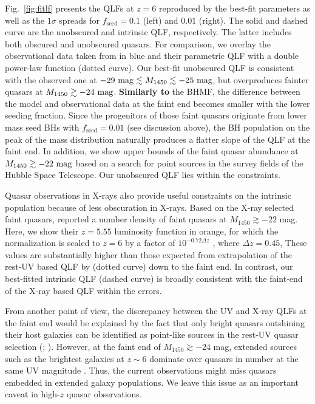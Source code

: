 \documentclass[twocolumn, twocolappendix]{aastex63}
\newcommand{\fseed}{f_\mathrm{seed}}
\newcommand{\Muv}{M_{1450}}
\begin{document}
\begin{CJK*}{UTF8}{gbsn}
Fig.~\ref{fig:fitlf} presents the QLFs at $z=6$ reproduced by the best-fit parameters as well as the $1\sigma$ spreads
for $\fseed = 0.1$ (left) and $0.01$ (right).
The solid and dashed curve are the unobscured and intrinsic QLF, respectively.
The latter includes both obscured and unobscured quasars.
For comparison, we overlay the observational data taken from  in blue
and their parametric QLF with a double power-law function (dotted curve).
Our best-fit unobscured QLF is consistent with the observed one at $-29~{\rm mag} \lesssim \Muv \lesssim -25~{\rm mag}$,
but overproduces fainter quasars at $\Muv\gtrsim -24~{\rm mag}$.
\textbf{Similarly to} the BHMF, the difference between the model and observational data at the faint end becomes smaller with
the lower seeding fraction.
Since the progenitors of those faint quasars originate from lower mass seed BHs with $\fseed =0.01$ (see discussion above),
the BH population on the peak of the mass distribution naturally produces a flatter slope of the QLF at the faint end.
In addition, we show upper bounds of the faint quasar abundance at $\Muv\gtrsim -22~{\rm mag}$ \citep[green;][]{2022NatAs...6..850J}
based on a search for point sources in the survey fields of the Hubble Space Telescope.
Our unobscured QLF lies within the constraints.


Quasar observations in X-rays also provide 
useful constraints on the intrinsic population because of less obscuration in X-rays.
Based on the X-ray selected faint quasars, \cite{2019ApJ...884...19G} reported a number density of 
faint quasars at $\Muv \gtrsim -22$ mag.
Here, we show their $z=5.55$ luminosity function in orange,
for which the normalization is scaled to $z=6$ by a factor of
$10^{-0.72\Delta z}$ \citep{2016ApJ...833..222J}, where $\Delta z=0.45$,
These values are substantially higher than those expected from extrapolation of the rest-UV based QLF by 
 (dotted curve) down to the faint end.
In contrast, our best-fitted intrinsic QLF (dashed curve) is broadly consistent with the faint-end of the X-ray based QLF within the errors.

From another point of view, the discrepancy between the UV and X-ray QLFs at the faint end would be explained by the fact that 
only bright quasars outshining their host galaxies can be identified as point-like sources in the rest-UV quasar selection 
(; \citealt{2020MNRAS.495.2135N,2020MNRAS.494.1771A,2021MNRAS.502.2757O,2021MNRAS.502..662B,2022arXiv220712282K}).
However, at the faint end of $\Muv\gtrsim -24$ mag, extended sources such as the brightest galaxies at $z\sim 6$ 
dominate over quasars in number at the same UV magnitude \citep{2022ApJS..259...20H}.
Thus, the current observations might miss quasars embedded in extended galaxy populations. 
We leave this issue as an important caveat in high-$z$ quasar observations.



\end{CJK*}
\end{document}
